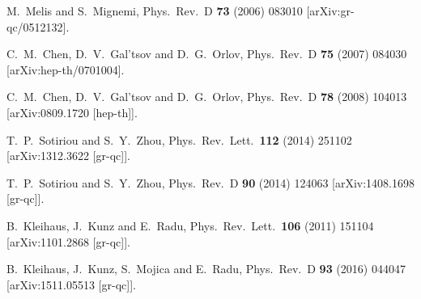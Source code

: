 \documentclass[12pt]{article}
\begin{document}
\begin{small}
\begin{thebibliography}{99}
  M.~Melis and S.~Mignemi,
  Phys.\ Rev.\  D {\bf 73} (2006) 083010
  [arXiv:gr-qc/0512132].

  C.~M.~Chen, D.~V.~Gal'tsov and D.~G.~Orlov,
  Phys.\ Rev.\  D {\bf 75} (2007) 084030
  [arXiv:hep-th/0701004].

  C.~M.~Chen, D.~V.~Gal'tsov and D.~G.~Orlov,
  Phys.\ Rev.\  D {\bf 78} (2008) 104013
  [arXiv:0809.1720 [hep-th]].

  T.~P.~Sotiriou and S.~Y.~Zhou,
  Phys.\ Rev.\ Lett.\  {\bf 112} (2014) 251102
  [arXiv:1312.3622 [gr-qc]].

  T.~P.~Sotiriou and S.~Y.~Zhou,
  Phys.\ Rev.\ D {\bf 90} (2014) 124063
  [arXiv:1408.1698 [gr-qc]].

  B.~Kleihaus, J.~Kunz and E.~Radu,
  Phys.\ Rev.\ Lett.\  {\bf 106} (2011) 151104
  [arXiv:1101.2868 [gr-qc]].

  B.~Kleihaus, J.~Kunz, S.~Mojica and E.~Radu,
  Phys.\ Rev.\ D {\bf 93} (2016)   044047
  [arXiv:1511.05513 [gr-qc]].


\end{thebibliography}
\end{small}
\end{document}
